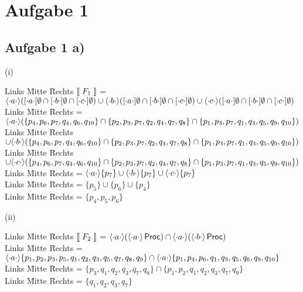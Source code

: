 
  \section*{Aufgabe 1}

\subsection*{Aufgabe 1 a)}
(i)
\begin{tabbing}
    Links \= Mitte \= Rechts \kill
$\left \llbracket \; F_1 \; \right \rrbracket$ \> = \> 
$\langle \cdot a \cdot \rangle ([ \cdot a \cdot ]  \emptyset \cap [ \cdot b \cdot ]  \emptyset \cap [ \cdot c \cdot ]  \emptyset) \cup 
\langle \cdot b \cdot \rangle ([ \cdot a \cdot ]  \emptyset \cap [ \cdot b \cdot ]  \emptyset \cap [ \cdot c \cdot ]  \emptyset) \cup 
\langle \cdot c \cdot \rangle ([ \cdot a \cdot ]  \emptyset \cap [ \cdot b \cdot ]  \emptyset \cap [ \cdot c \cdot ]  \emptyset)$
\\
Links \= Mitte \= Rechts \kill
\> = \> $\langle \cdot a \cdot \rangle (\lbrace p_4,p_6,p_7,q_4,q_6,q_{10} \rbrace \cap 
\lbrace p_2,p_3,p_7,q_2,q_4,q_7,q_8 \rbrace \cap 
\lbrace p_1,p_3,p_7,q_1,q_3,q_5,q_9,q_{10} \rbrace)$ \\
Links \= Mitte \= Rechts \kill
\>  \> $\cup 
\langle \cdot b \cdot \rangle (\lbrace p_4,p_6,p_7,q_4,q_6,q_{10} \rbrace \cap 
\lbrace p_2,p_3,p_7,q_2,q_4,q_7,q_8 \rbrace \cap 
\lbrace p_1,p_3,p_7,q_1,q_3,q_5,q_9,q_{10} \rbrace)$ \\
Links \= Mitte \= Rechts \kill
\>  \> $\cup 
\langle \cdot c \cdot \rangle (\lbrace p_4,p_6,p_7,q_4,q_6,q_{10} \rbrace \cap 
\lbrace p_2,p_3,p_7,q_2,q_4,q_7,q_8 \rbrace \cap 
\lbrace p_1,p_3,p_7,q_1,q_3,q_5,q_9,q_{10} \rbrace)$\\
Links \= Mitte \= Rechts \kill
\> = \> $\langle \cdot a \cdot \rangle \lbrace p_7 \rbrace \cup \langle \cdot b \cdot \rangle \lbrace p_7 \rbrace \cup \langle \cdot c \cdot \rangle \lbrace p_7 \rbrace$\\
Links \= Mitte \= Rechts \kill
\> = \> $\lbrace p_5 \rbrace \cup \lbrace p_6 \rbrace \cup \lbrace p_4 \rbrace$\\
Links \= Mitte \= Rechts \kill
\> = \> $\lbrace p_4,p_5,p_6 \rbrace$
\\
  \end{tabbing}
(ii)
\begin{tabbing}
    Links \= Mitte \= Rechts \kill
$\left \llbracket \; F_2 \; \right \rrbracket$ \> = \> 
$\langle \cdot a \cdot \rangle (\langle \cdot a \cdot \rangle \operatorname{\sf Proc}) \cap \langle \cdot a \cdot \rangle (\langle \cdot b \cdot \rangle \operatorname{\sf Proc})$
\\
Links \= Mitte \= Rechts \kill
\> = \> $\langle \cdot a \cdot \rangle \lbrace p_1,p_2,p_3,p_5,q_1,q_2,q_3,q_5,q_7,q_8,q_9 \rbrace \cap 
\langle \cdot a \cdot \rangle \lbrace p_1,p_4,p_6,q_1,q_3,q_5,q_6,q_9,q_{10} \rbrace$ \\
Links \= Mitte \= Rechts \kill
\> = \> $\lbrace p_3,q_1,q_2,q_3,q_7,q_8 \rbrace \cap 
\lbrace p_1,p_2,q_1,q_2,q_3,q_7,q_9 \rbrace$ \\
Links \= Mitte \= Rechts \kill
\> = \> $\lbrace q_1,q_2,q_3,q_7 \rbrace$\\
  \end{tabbing}
